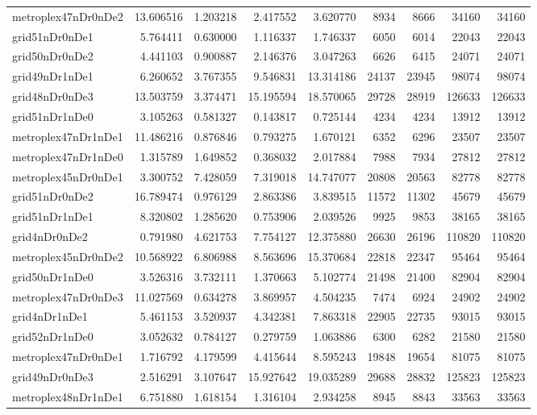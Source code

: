 \begin{longtable}{|l|r|r|r|r|r|r|r|r|}
metroplex47nDr0nDe2 & 13.606516 & 1.203218 & 2.417552 & 3.620770 & 8934 & 8666 & 34160 & 34160 \\
grid51nDr0nDe1 & 5.764411 & 0.630000 & 1.116337 & 1.746337 & 6050 & 6014 & 22043 & 22043 \\
grid50nDr0nDe2 & 4.441103 & 0.900887 & 2.146376 & 3.047263 & 6626 & 6415 & 24071 & 24071 \\
grid49nDr1nDe1 & 6.260652 & 3.767355 & 9.546831 & 13.314186 & 24137 & 23945 & 98074 & 98074 \\
grid48nDr0nDe3 & 13.503759 & 3.374471 & 15.195594 & 18.570065 & 29728 & 28919 & 126633 & 126633 \\
grid51nDr1nDe0 & 3.105263 & 0.581327 & 0.143817 & 0.725144 & 4234 & 4234 & 13912 & 13912 \\
metroplex47nDr1nDe1 & 11.486216 & 0.876846 & 0.793275 & 1.670121 & 6352 & 6296 & 23507 & 23507 \\
metroplex47nDr1nDe0 & 1.315789 & 1.649852 & 0.368032 & 2.017884 & 7988 & 7934 & 27812 & 27812 \\
metroplex45nDr0nDe1 & 3.300752 & 7.428059 & 7.319018 & 14.747077 & 20808 & 20563 & 82778 & 82778 \\
grid51nDr0nDe2 & 16.789474 & 0.976129 & 2.863386 & 3.839515 & 11572 & 11302 & 45679 & 45679 \\
grid51nDr1nDe1 & 8.320802 & 1.285620 & 0.753906 & 2.039526 & 9925 & 9853 & 38165 & 38165 \\
grid4nDr0nDe2 & 0.791980 & 4.621753 & 7.754127 & 12.375880 & 26630 & 26196 & 110820 & 110820 \\
metroplex45nDr0nDe2 & 10.568922 & 6.806988 & 8.563696 & 15.370684 & 22818 & 22347 & 95464 & 95464 \\
grid50nDr1nDe0 & 3.526316 & 3.732111 & 1.370663 & 5.102774 & 21498 & 21400 & 82904 & 82904 \\
metroplex47nDr0nDe3 & 11.027569 & 0.634278 & 3.869957 & 4.504235 & 7474 & 6924 & 24902 & 24902 \\
grid4nDr1nDe1 & 5.461153 & 3.520937 & 4.342381 & 7.863318 & 22905 & 22735 & 93015 & 93015 \\
grid52nDr1nDe0 & 3.052632 & 0.784127 & 0.279759 & 1.063886 & 6300 & 6282 & 21580 & 21580 \\
metroplex47nDr0nDe1 & 1.716792 & 4.179599 & 4.415644 & 8.595243 & 19848 & 19654 & 81075 & 81075 \\
grid49nDr0nDe3 & 2.516291 & 3.107647 & 15.927642 & 19.035289 & 29688 & 28832 & 125823 & 125823 \\
metroplex48nDr1nDe1 & 6.751880 & 1.618154 & 1.316104 & 2.934258 & 8945 & 8843 & 33563 & 33563 \\

\end{longtable}
